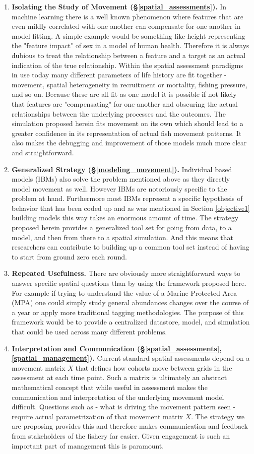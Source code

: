 \documentclass[11pt]{article}
\begin{document}
\begin{enumerate}
\item \textbf{Isolating the Study of Movement (\S \ref{spatial_assessments}).} In machine learning there is a well known phenomenon where features that are even mildly correlated with one another can compensate for one another in model fitting. A simple example would be something like height representing the "feature impact" of sex in a model of human health. Therefore it is always dubious to treat the relationship between a feature and a target as an actual indication of the true relationship. Within the spatial assessment paradigms in use today many different parameters of life history are fit together - movement, spatial heterogeneity in recruitment or mortality, fishing pressure, and so on. Because these are all fit as one model it is possible if not likely that features are "compensating" for one another and obscuring the actual relationships between the underlying processes and the outcomes. The simulation proposed herein fits movement on its own which should lead to a greater confidence in its representation of actual fish movement patterns. It also makes the debugging and improvement of those models much more clear and straightforward. 
\item \textbf{Generalized Strategy (\S \ref{modeling_movement}).} Individual based models (IBMs) also solve the problem mentioned above as they directly model movement as well. However IBMs are notoriously specific to the problem at hand. Furthermore most IBMs represent a specific hypothesis of behavior that has been coded up and as was mentioned in Section \ref{objective1} building models this way takes an enormous amount of time. The strategy proposed herein provides a generalized tool set for going from data, to a model, and then from there to a spatial simulation. And this means that researchers can contribute to building up a common tool set instead of having to start from ground zero each round.
\item \textbf{Repeated Usefulness.} There are obviously more straightforward ways to answer specific spatial questions than by using the framework proposed here. For example if trying to understand the value of a Marine Protected Area (MPA) one could simply study general abundances changes over the course of a year or apply more traditional tagging methodologies. The purpose of this framework would be to provide a centralized datastore, model, and simulation that could be used across many different problems.
\item \textbf{Interpretation and Communication (\S \ref{spatial_assessments}, \ref{spatial_management}).} Current standard spatial assessments depend on a movement matrix $X$ that defines how cohorts move between grids in the assessment at each time point. Such a matrix is ultimately an abstract mathematical concept that while useful in assessment makes the communication and interpretation of the underlying movement model difficult. Questions such as - what is driving the movement pattern seen - require actual parametrization of that movement matrix $X$. The strategy we are proposing provides this and therefore makes communication and feedback from stakeholders of the fishery far easier. Given engagement is such an important part of management this is paramount.  

\end{enumerate}
\end{document}

